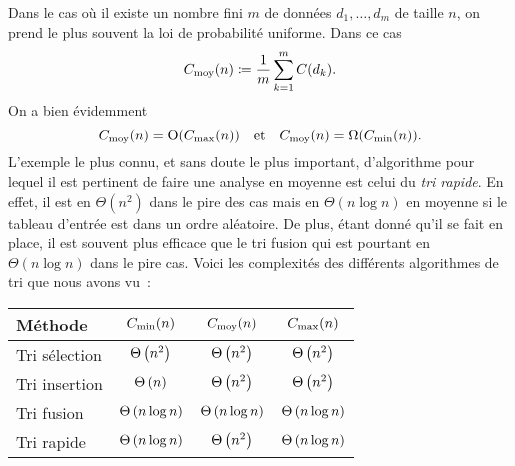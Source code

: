 \documentclass{magnolia}
\begin{document}
\begin{remarques}
\remarque Dans le cas où il existe un nombre fini $m$ de données $d_1,\ldots,d_m$ de taille $n$, on prend
  le plus souvent la loi de probabilité uniforme. Dans ce cas
  \[C_{\rm moy}(n)\coloneqq \frac{1}{m}\sum_{k=1}^m C(d_k).\]
\remarque On a bien évidemment
  \[C_{\rm moy}(n) = {\rm O}(C_{\rm max}(n)) \quad\text{et}\quad C_{\rm moy}(n) = \Omega(C_{\rm min}(n)).\]
\remarque L'exemple le plus connu, et sans doute le plus important, d'algorithme
pour lequel il est pertinent de faire une analyse en moyenne est
celui du \emph{tri rapide}. En effet, il est en $\Theta\left(n^2\right)$
dans le pire des cas mais en $\Theta(n \log n)$ en moyenne si
le tableau d'entrée est dans un ordre aléatoire. De plus, étant donné qu'il se fait
en place, il est
souvent plus efficace que le tri fusion qui est pourtant en
$\Theta(n \log n)$ dans le pire cas.
\remarque Voici les complexités des différents algorithmes de tri que nous avons vu~:
\begin{center}
\begin{tabular}{|l|c|c|c|}
\hline
Méthode & $C_{\rm min}(n)$ & $C_{\rm moy}(n)$ & $C_{\rm max}(n)$ \\
\hline
\hline
Tri sélection & $\Theta\left(n^2\right)$ & $\Theta\left(n^2\right)$& $\Theta\left(n^2\right)$\\
\hline
Tri insertion & $\Theta\left(n\right)$& $\Theta\left(n^2\right)$& $\Theta\left(n^2\right)$\\
\hline
Tri fusion & $\Theta\left(n \log n\right)$ & $\Theta\left(n \log n\right)$& $\Theta\left(n \log n\right)$\\
\hline
Tri rapide & $\Theta\left(n \log n\right)$& $\Theta\left(n^2\right)$& $\Theta\left(n \log n\right)$\\
\hline
\end{tabular}
\end{center}
\end{remarques}


\end{document}
